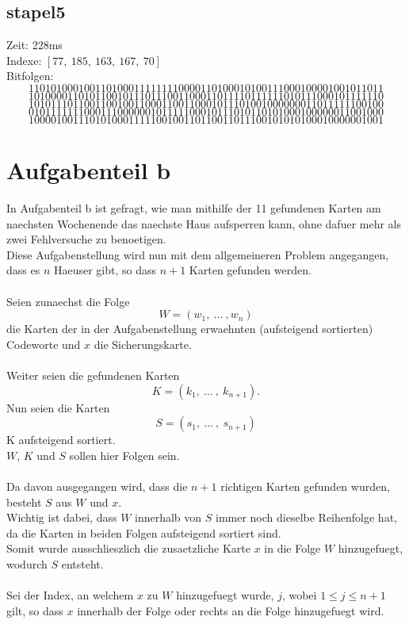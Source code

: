 \documentclass[a4paper,10pt,ngerman]{scrartcl}
\begin{document}
{\subsection{stapel5}
Zeit: 228ms \\
Indexe: $[77, \ 185, \ 163, \ 167, \ 70]$ \\
Bitfolgen:
$$
1101010001001101000111111110000110100010100111000100001001011011
$$
$$
1010000110101100101110111001100011011110111111010111000101111110
$$
$$
1010111011001100100110001100110001011101001000000011011111100100
$$
$$
0101111111000111000000101111100010111010110101000100000011001000
$$
$$
1000010011101010001111100100110110011011100101010100010000001001
$$

\section{Aufgabenteil b}
In Aufgabenteil b ist gefragt, wie man mithilfe der 11 gefundenen Karten am naechsten Wochenende das naechste Haus aufsperren kann, ohne dafuer mehr als zwei Fehlversuche zu benoetigen.\\
Diese Aufgabenstellung wird nun mit dem allgemeineren  Problem angegangen, dass es $n$ Haeuser gibt, so dass $n+1$ Karten gefunden werden.
\\\\
Seien zunaechst die Folge 
$$
W = (w_1, \ \dots \ , w_n)
$$
die Karten der in der Aufgabenstellung erwaehnten (aufsteigend sortierten) Codeworte und $x$ die Sicherungskarte.\\
\\
Weiter seien die gefundenen Karten
$$K = (k_1, \ \dots \ , \ k_{n+1}). $$
Nun seien die Karten 
$$S = (s_1, \ \dots \ , \ s_{n+1}) $$
K aufsteigend sortiert.\\
$W$, $K$ und $S$ sollen hier Folgen sein.
\\\\
Da davon ausgegangen wird, dass die $n+1$ richtigen Karten gefunden wurden, besteht $S$ aus $W$ und $x$.
\\
Wichtig ist dabei, dass $W$ innerhalb von $S$ immer noch dieselbe Reihenfolge hat, da die Karten in beiden Folgen aufsteigend sortiert sind.\\
Somit wurde ausschlieszlich die zusaetzliche Karte $x$ in die Folge $W$ hinzugefuegt, wodurch $S$ entsteht.
\\\\
Sei der Index, an welchem $x$ zu $W$ hinzugefuegt wurde, $j$, wobei $1 \leq j \leq n+1$ gilt, so dass $x$ innerhalb der Folge oder rechts an die Folge hinzugefuegt wird.
}
\end{document}
